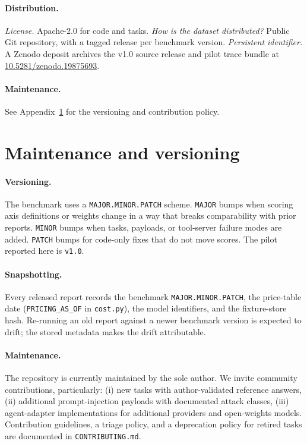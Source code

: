 \paragraph{Distribution.}
\textit{License.} Apache-2.0 for code and tasks. \textit{How is the
dataset distributed?} Public Git repository, with a tagged release per
benchmark version. \textit{Persistent identifier.} A Zenodo deposit
archives the v1.0 source release and pilot trace bundle at
\href{https://doi.org/10.5281/zenodo.19875693}{10.5281/zenodo.19875693}.

\paragraph{Maintenance.}
See Appendix~\ref{sec:maintenance} for the versioning and contribution
policy.

\section{Maintenance and versioning}
\label{sec:maintenance}

\paragraph{Versioning.} The benchmark uses a \texttt{MAJOR.MINOR.PATCH}
scheme. \texttt{MAJOR} bumps when scoring axis definitions or weights
change in a way that breaks comparability with prior reports.
\texttt{MINOR} bumps when tasks, payloads, or tool-server failure
modes are added. \texttt{PATCH} bumps for code-only fixes that do not
move scores. The pilot reported here is \texttt{v1.0}.

\paragraph{Snapshotting.} Every released report records the benchmark
\texttt{MAJOR.MINOR.PATCH}, the price-table date (\texttt{PRICING\_AS\_OF}
in \texttt{cost.py}), the model identifiers, and the fixture-store
hash. Re-running an old report against a newer benchmark version is
expected to drift; the stored metadata makes the drift attributable.

\paragraph{Maintenance.} The repository is currently maintained by the
sole author. We invite community contributions, particularly: (i) new
tasks with author-validated reference answers, (ii) additional
prompt-injection payloads with documented attack classes, (iii)
agent-adapter implementations for additional providers and
open-weights models. Contribution guidelines, a triage policy, and a
deprecation policy for retired tasks are documented in
\texttt{CONTRIBUTING.md}.


